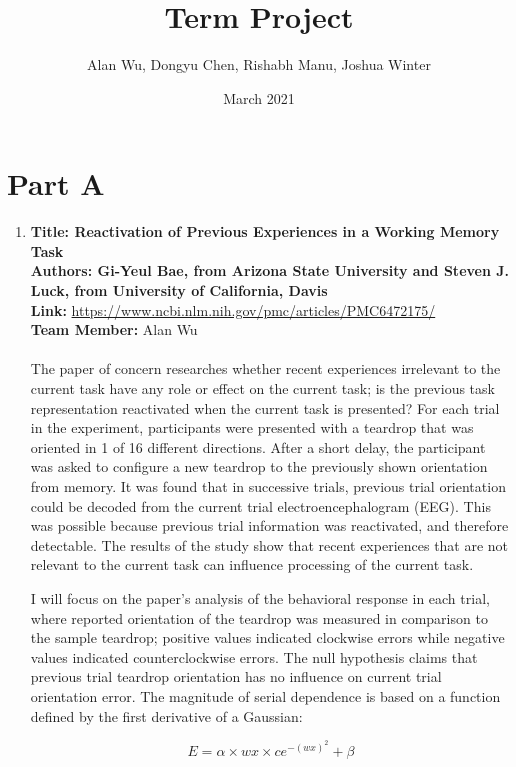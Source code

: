 \documentclass[letterpaper, 12 pt, conference]{article}
\title{Term Project}
\author{Alan Wu, Dongyu  Chen, Rishabh Manu, Joshua Winter}
\date{March 2021}
\begin{document}
\maketitle

\section{Part A}
\begin{enumerate}
    \item 
    \textbf{Title: Reactivation of Previous Experiences in a Working Memory Task} 
     \\ 
     \textbf{Authors: Gi-Yeul Bae, from Arizona State University and Steven J. Luck, from University of California, Davis }
    \\
    \textbf{Link:} 
    \url{https://www.ncbi.nlm.nih.gov/pmc/articles/PMC6472175/}
    \\
    \textbf{Team Member: } Alan Wu
    \\\\
    The paper of concern researches whether recent experiences irrelevant to the current task have any role or effect on the current task; is the previous task representation reactivated when the current task is presented? For each trial in the experiment, participants were presented with a teardrop that was oriented in 1 of 16 different directions. After a short delay, the participant was asked to configure a new teardrop to the previously shown orientation from memory. It was found that in successive trials, previous trial orientation could be decoded from the current trial electroencephalogram (EEG). This was possible because previous trial information was reactivated, and therefore detectable. The results of the study show that recent experiences that are not relevant to the current task can influence processing of the current task. 

I will focus on the paper's analysis of the behavioral response in each trial, where reported orientation of the teardrop was measured in comparison to the sample teardrop; positive values indicated clockwise errors while negative values indicated counterclockwise errors. The null hypothesis claims that previous trial teardrop orientation has no influence on current trial orientation error. The magnitude of serial dependence is based on a function defined by the first derivative of a Gaussian: 

$$E = \alpha \times wx \times ce^{-(wx)^2} + \beta $$


\end{enumerate}
\end{document}
